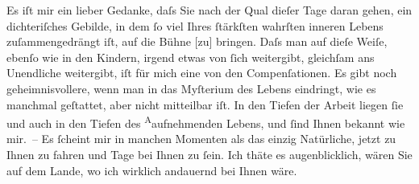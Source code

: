\pstart
           Es iſt mir ein lieber Gedanke, daſs Sie nach der Qual dieſer Tage daran {\pb}gehen, ein dichteriſches Gebilde, in dem{ }ſo viel Ihres{ }ſtärkſten wahrſten inneren Lebens zuſammengedrängt iſt, auf die Bühne
                  {[}zu{]} bringen. Daſs man auf dieſe Weiſe, ebenſo wie in den Kindern,
               irgend etwas von{ }ſich weitergibt, gleichſam ans Unendliche weitergibt, iſt für mich
               eine von den Compenſationen. Es gibt noch geheimnisvollere, wenn man in das Myſterium
               des Lebens eindringt, wie es manchmal geſtattet, aber {\pb}nicht mitteilbar iſt. In den
               Tiefen der Arbeit liegen{ }ſie und auch in den Tiefen des \substVorne{}\textsuperscript{A}\substDazwischen{}a\substHinten{}ufnehmenden Lebens, und{ }ſind Ihnen bekannt wie mir. – Es{ }ſcheint mir in
               manchen Momenten als das einzig Natürliche, jetzt zu Ihnen zu fahren und Tage bei
               Ihnen zu{ }ſein. Ich thäte es augenblicklich, wären Sie auf dem Lande, wo ich wirklich
               andauernd bei Ihnen wäre.\pend
           
